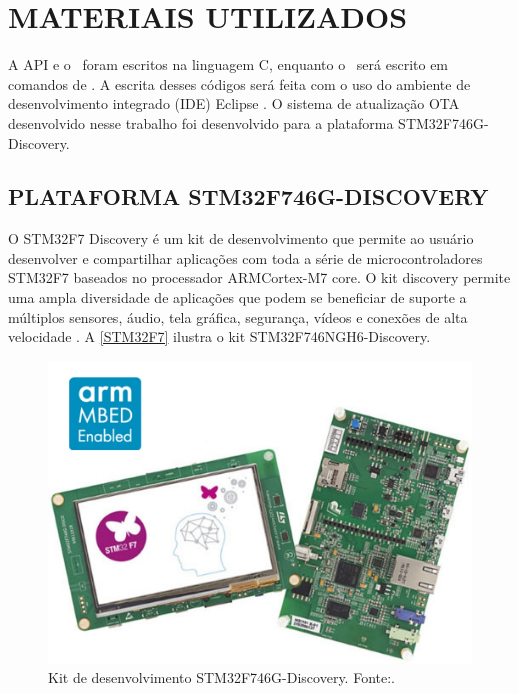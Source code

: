 \section{MATERIAIS UTILIZADOS}

A API e o \bootloader\ foram escritos na linguagem C, enquanto o \linker\ será escrito em comandos de \linker. A escrita desses códigos será feita com o uso do ambiente de desenvolvimento integrado (IDE) Eclipse \cite{Eclipse}. O sistema de atualização OTA desenvolvido nesse trabalho foi desenvolvido para a plataforma STM32F746G-Discovery.

\subsection{PLATAFORMA STM32F746G-DISCOVERY}

O STM32F7 Discovery é um kit de desenvolvimento que permite ao usuário desenvolver e compartilhar aplicações com toda a série de microcontroladores STM32F7 baseados no processador ARM\textregistered  Cortex\textregistered-M7 core.
O kit discovery permite uma ampla diversidade de aplicações que podem se beneficiar de suporte a múltiplos sensores, áudio, tela gráfica, segurança, vídeos e conexões de alta velocidade \cite{STM32F7}.
A \autoref{STM32F7} ilustra o kit STM32F746NGH6-Discovery.

\begin{figure}[H]
    \scriptsize
     \centering
     \includegraphics[scale=0.4]{dados/figuras/STM32F7.jpg}
     \caption{Kit de desenvolvimento STM32F746G-Discovery. \newline Fonte:\cite{STM32F7}.}
     \label{STM32F7}
\end{figure}


